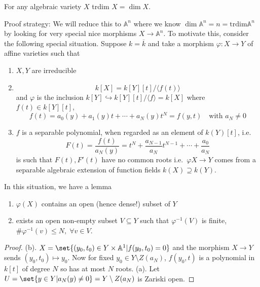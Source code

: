 \documentclass{article}
\newcommand{\A}{\mathbb{A}}
\begin{document}
\begin{thm}
    For any algebraic variety $X$ trdim $X = \dim X$.
\end{thm}
Proof strategy: We will reduce this to $\A^n$ where we know $\dim \A^n = n = \text{trdim} \A^n$ by looking for very special nice morphisms $X \to \A^n$.
To motivate this, consider the following special situation.
Suppose $k = \overline{k}$ and take a morphism $\varphi: X \to Y$ of affine varieties such that
\begin{enumerate}[label=(\arabic*)]
    \item $X, Y$ are irreducible
    \item \begin{equation*}
        k[X] = k[Y][t]/\langle f(t) \rangle
        \end{equation*}
        and $\varphi$ is the inclusion $k[Y] \hookrightarrow k[Y][t]/\langle f\rangle = k[X]$ where $f(t) \in k[Y][t]$,
        \begin{equation*}
            f(t) = a_0(y) + a_1(y)t + \dotsb + a_N(y) t^N = f(y, t) \quad \text{with } a_N \neq 0
        \end{equation*}
    \item $f$ is a separable polynomial, when regarded as an element of $k(Y)[t]$, i.e.\
        \begin{equation*}
            F(t) = \frac{f(t)}{a_N(y)} = t^N + \frac{a_{N-1}}{a_N} t^{N-1} + \dotsb + \frac{a_0}{a_N}
        \end{equation*}
        is such that $F(t), F'(t)$ have no common roots i.e.\ $\varphi X \to Y$ comes from a separable algebraic extension of function fields $k(X) \supseteq k(Y)$.
\end{enumerate}
In this situation, we have a lemma
\begin{lemma}
    \leavevmode
    \begin{enumerate}[label=(\alph*)]
        \item $\varphi(X)$ contains an open (hence dense!) subset of $Y$
        \item exists an open non-empty subset $V \subseteq Y$ such that $\varphi^{-1}(V)$ is finite, $\# \varphi^{-1}(v) \leq N, \; \forall v \in V$.
    \end{enumerate}
\end{lemma}
\begin{proof}
    (b). $X = \set{(y_0, t_0) \in Y \times \A^1 | f(y_0, t_0) = 0}$ and the morphism $X \to Y$ sends $(y_0, t_0) \mapsto y_0$.
    Now for fixed $y_0 \in Y \setminus Z(a_N)$, $f(y_0, t)$ is a polynomial in $k[t]$ of degree $N$ so has at most $N$ roots.
    (a). Let $U = \set{y \in Y | a_N(y) \neq 0} = Y \setminus Z(a_N)$ is Zariski open.
\end{proof}
\end{document}
